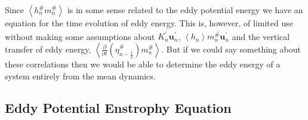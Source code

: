 \documentclass[12pt,a4paper]{report}
\newcommand*\thkmean[1]{\overline{#1}}
\newcommand*\thkres[1]{{#1}^{\prime}}
\newcommand*\nthkmean[1]{\left\langle{#1}\right\rangle}
\newcommand*\nthkres[1]{{#1}^{\#}}
\newcommand*{\half}{\frac{1}{2}}
\begin{document}
                Since $\nthkmean{\nthkres{h}_{n} \nthkres{m}_{n}}$ is in some sense
                related to the eddy potential energy we have
                an equation for the time evolution of eddy energy. This
                is, however, of limited use without making some assumptions about
                $\thkmean{\thkres{K}_{n} \thkres{\boldsymbol{u}}_{n}}$, 
                $\nthkmean{h_{n}}\thkmean{\nthkres{m}_{n}\thkres{\boldsymbol{u}}_{n}}$ 
                and the vertical transfer of eddy energy, 
                $ \nthkmean{\frac{\partial}{\partial t}\left(\nthkres{\eta}_{n-\half }\right) \nthkres{m}_{n}}$. 
                But if we could say something about these correlations
                then we would be able to determine the eddy energy of a system
                entirely from the mean dynamics.
                
                
                \subsection{Eddy Potential Enstrophy Equation}
              
\end{document}
